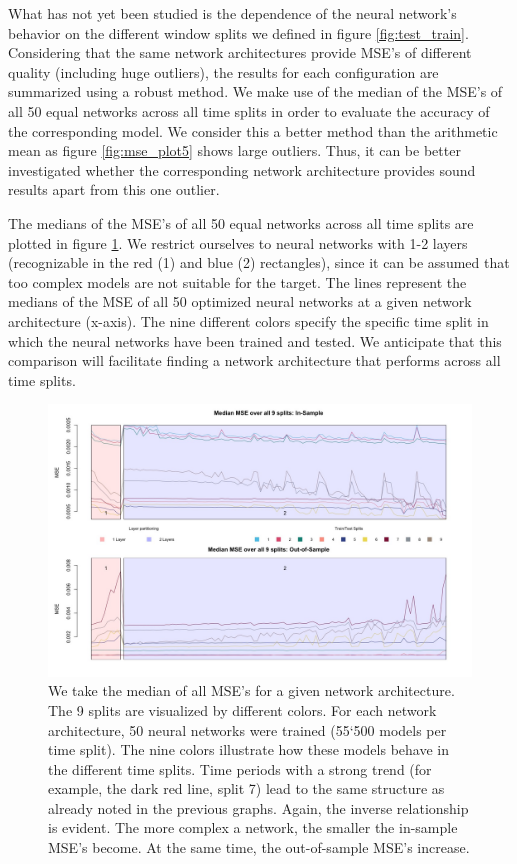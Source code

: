 \documentclass[
]{article}
\begin{document}
What has not yet been studied is the dependence of the neural network's
behavior on the different window splits we defined in figure
\ref{fig:test_train}. Considering that the same network architectures
provide MSE's of different quality (including huge outliers), the
results for each configuration are summarized using a robust method. We
make use of the median of the MSE's of all 50 equal networks across all
time splits in order to evaluate the accuracy of the corresponding
model. We consider this a better method than the arithmetic mean as
figure \ref{fig:mse_plot5} shows large outliers. Thus, it can be better
investigated whether the corresponding network architecture provides
sound results apart from this one outlier.

\newpage

The medians of the MSE's of all 50 equal networks across all time splits
are plotted in figure \ref{fig:mse_median}. We restrict ourselves to
neural networks with 1-2 layers (recognizable in the red (1) and blue
(2) rectangles), since it can be assumed that too complex models are not
suitable for the target. The lines represent the medians of the MSE of
all 50 optimized neural networks at a given network architecture
(x-axis). The nine different colors specify the specific time split in
which the neural networks have been trained and tested. We anticipate
that this comparison will facilitate finding a network architecture that
performs across all time splits.

\begin{figure}

{\centering \includegraphics[width=1\linewidth]{images/batch5/median_mse} 

}

\caption{We take the median of all MSE's for a given network architecture. The 9 splits are visualized by different colors. For each network architecture, 50 neural networks were trained (55`500 models per time split). The nine colors illustrate how these models behave in the different time splits. Time periods with a strong trend (for example, the dark red line, split 7) lead to the same structure as already noted in the previous graphs. Again, the inverse relationship is evident. The more complex a network, the smaller the in-sample MSE's become. At the same time, the out-of-sample MSE's increase.}\label{fig:mse_median}
\end{figure}
\end{document}
